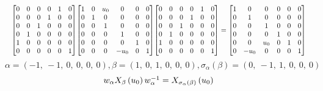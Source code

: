 \documentclass[11pt]{article}
\theoremstyle{definition}
\begin{document}
\[
\scaletoalign{\textwidth}{{\left[\begin{matrix}0 & 0 & 0 & 0 & 1 & 0\\0 & 0 & 0 & 1 & 0 & 0\\0 & 0 & 1 & 0 & 0 & 0\\0 & 1 & 0 & 0 & 0 & 0\\1 & 0 & 0 & 0 & 0 & 0\\0 & 0 & 0 & 0 & 0 & 1\end{matrix}\right]} {\left[\begin{matrix}1 & 0 & u_{0} & 0 & 0 & 0\\0 & 1 & 0 & 0 & 0 & 0\\0 & 0 & 1 & 0 & 0 & 0\\0 & 0 & 0 & 1 & 0 & 0\\0 & 0 & 0 & 0 & 1 & 0\\0 & 0 & 0 & - u_{0} & 0 & 1\end{matrix}\right]} {\left[\begin{matrix}0 & 0 & 0 & 0 & 1 & 0\\0 & 0 & 0 & 1 & 0 & 0\\0 & 0 & 1 & 0 & 0 & 0\\0 & 1 & 0 & 0 & 0 & 0\\1 & 0 & 0 & 0 & 0 & 0\\0 & 0 & 0 & 0 & 0 & 1\end{matrix}\right]} = {\left[\begin{matrix}1 & 0 & 0 & 0 & 0 & 0\\0 & 1 & 0 & 0 & 0 & 0\\0 & 0 & 1 & 0 & 0 & 0\\0 & 0 & 0 & 1 & 0 & 0\\0 & 0 & u_{0} & 0 & 1 & 0\\0 & - u_{0} & 0 & 0 & 0 & 1\end{matrix}\right]}}
\]
\[
\alpha = \left( -1, \  -1, \  0, \  0, \  0, \  0\right), \beta = \left( 1, \  0, \  1, \  0, \  0, \  0\right), \sigma_{\alpha}(\beta) = \left( 0, \  -1, \  1, \  0, \  0, \  0\right)
\]
\[
\scaletoalign{\textwidth}{w_{\alpha} X_{\beta}\left(u_{0}\right) w_{\alpha}^{-1} = X_{\sigma_{\alpha}\left(\beta\right)}\left(u_{0}\right)}
\]
\end{document}
